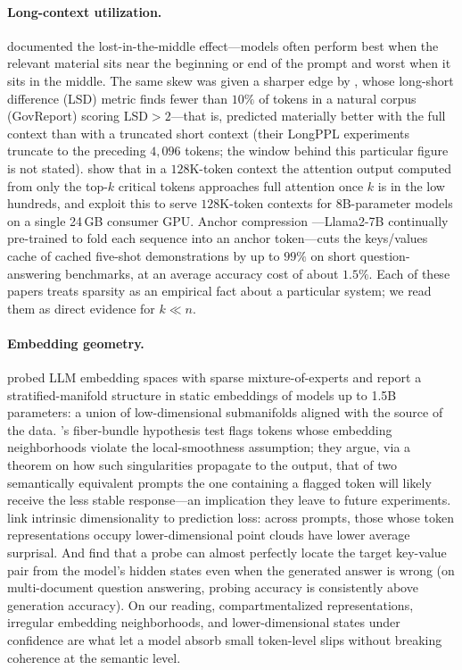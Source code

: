\paragraph{Long-context utilization.}
\citet{liu2023lost} documented the lost-in-the-middle effect---models often perform best when the relevant material sits near the beginning or end of the prompt and worst when it sits in the middle. The same skew was given a sharper edge by \citet{fang2024what}, whose long-short difference (LSD) metric finds fewer than $10\%$ of tokens in a natural corpus (GovReport) scoring LSD$>2$---that is, predicted materially better with the full context than with a truncated short context (their LongPPL experiments truncate to the preceding $4{,}096$ tokens; the window behind this particular figure is not stated). \citet{liu2024retrieval} show that in a $128$K-token context the attention output computed from only the top-$k$ critical tokens approaches full attention once $k$ is in the low hundreds, and exploit this to serve $128$K-token contexts for 8B-parameter models on a single 24\,GB consumer GPU. Anchor compression \citep{pang2024anchor}---Llama2-7B continually pre-trained to fold each sequence into an anchor token---cuts the keys/values cache of cached five-shot demonstrations by up to $99\%$ on short question-answering benchmarks, at an average accuracy cost of about $1.5\%$. Each of these papers treats sparsity as an empirical fact about a particular system; we read them as direct evidence for $k \ll n$.

\paragraph{Embedding geometry.}
\citet{li2025unraveling} probed LLM embedding spaces with sparse mixture-of-experts and report a stratified-manifold structure in static embeddings of models up to 1.5B parameters: a union of low-dimensional submanifolds aligned with the source of the data. \citet{robinson2025token}'s fiber-bundle hypothesis test flags tokens whose embedding neighborhoods violate the local-smoothness assumption; they argue, via a theorem on how such singularities propagate to the output, that of two semantically equivalent prompts the one containing a flagged token will likely receive the less stable response---an implication they leave to future experiments. \citet{viswanathan2024geometry} link intrinsic dimensionality to prediction loss: across prompts, those whose token representations occupy lower-dimensional point clouds have lower average surprisal. And \citet{gao2024insights} find that a probe can almost perfectly locate the target key-value pair from the model's hidden states even when the generated answer is wrong (on multi-document question answering, probing accuracy is consistently above generation accuracy). On our reading, compartmentalized representations, irregular embedding neighborhoods, and lower-dimensional states under confidence are what let a model absorb small token-level slips without breaking coherence at the semantic level.

